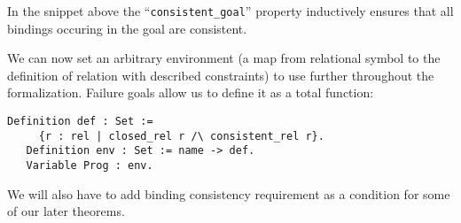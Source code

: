 In the snippet above the ``\lstinline[language=Coq]{consistent_goal}'' property inductively ensures that all bindings occuring
in the goal are consistent.

We can now set an arbitrary environment (a map from relational symbol to the definition of relation with described constraints) to use further throughout the formalization.
Failure goals allow us to define it as a total function:

\begin{lstlisting}[language=Coq,basicstyle=\footnotesize]
   Definition def : Set := 
     {r : rel | closed_rel r /\ consistent_rel r}.
   Definition env : Set := name -> def.
   Variable Prog : env.
\end{lstlisting}

We will also have to add binding consistency requirement as a condition for some of our later theorems.
